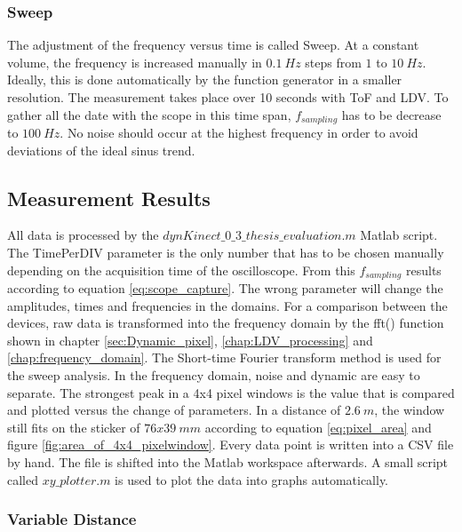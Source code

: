 \subsubsection{Sweep}
The adjustment of the frequency versus time is called Sweep. At a constant volume, the frequency is increased manually in $0.1~Hz$ steps from $1$ to $10~Hz$. Ideally, this is done automatically by the function generator in a smaller resolution. The measurement takes place over 10 seconds with ToF and LDV. To gather all the date with the scope in this time span, $f_{sampling}$ has to be decrease to $100~Hz$. No noise should occur at the highest frequency in order to avoid deviations of the ideal sinus trend. 

\newpage

\subsection{Measurement Results}
All data is processed by the $dynKinect\_0\_3\_thesis\_evaluation.m$ Matlab script. The TimePerDIV parameter is the only number that has to be chosen manually depending on the acquisition time of the oscilloscope. From this $f_{sampling}$ results according to equation \ref{eq:scope_capture}. The wrong parameter will change the amplitudes, times and frequencies in the domains. For a comparison between the devices, raw data is transformed into the frequency domain by the fft() function shown in chapter \ref{sec:Dynamic_pixel}, \ref{chap:LDV_processing} and \ref{chap:frequency_domain}. The Short-time Fourier transform method is used for the sweep analysis. In the frequency domain, noise and dynamic are easy to separate. The strongest peak in a 4x4 pixel windows is the value that is compared and plotted versus the change of parameters. In a distance of $2.6~m$, the window still fits on the sticker of $76x39~mm$ according to equation \ref{eq:pixel_area} and figure \ref{fig:area_of_4x4_pixelwindow}. Every data point is written into a CSV file by hand. The file is shifted into the Matlab workspace afterwards. A small script called $xy\_plotter.m$ is used to plot the data into graphs automatically.

\newpage

\subsubsection{Variable Distance}


